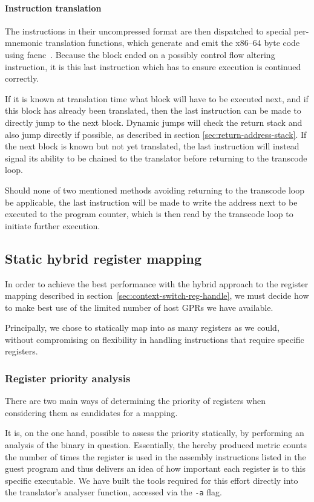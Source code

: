 \paragraph{Instruction translation} \mbox{}

The instructions in their uncompressed format are then dispatched to special per-mnemonic translation functions, which generate and emit the x86--64 byte code using faenc~\cite{faenc}.
Because the block ended on a possibly control flow altering instruction, it is this last instruction which has to ensure execution is continued correctly.

If it is known at translation time what block will have to be executed next, and if this block has already been translated, then the last instruction can be made to directly jump to the next block.
Dynamic jumps will check the return stack and also jump directly if possible, as described in section \ref{sec:return-address-stack}.
If the next block is known but not yet translated, the last instruction will instead signal its ability to be chained to the translator before returning to the transcode loop. %

Should none of two mentioned methods avoiding returning to the transcode loop be applicable, the last instruction will be made to write the address next to be executed to the program counter, which is then read by the transcode loop to initiate further execution.


\subsection{Static hybrid register mapping}
In order to achieve the best performance with the hybrid approach to the register mapping described in section~\vref{sec:context-switch-reg-handle}, we must decide how to make best use of the limited number of host GPRs we have available.

Principally, we chose to statically map into as many registers as we could, without compromising on flexibility in handling instructions that require specific registers.

\subsubsection{Register priority analysis}
There are two main ways of determining the priority of registers when considering them as candidates for a mapping.

It is, on the one hand, possible to assess the priority statically, by performing an analysis of the binary in question.
Essentially, the hereby produced metric counts the number of times the register is used in the assembly instructions listed in the guest program and thus delivers an idea of how important each register is to this specific executable.
We have built the tools required for this effort directly into the translator's analyser function, accessed via the \texttt{-a} flag. %

